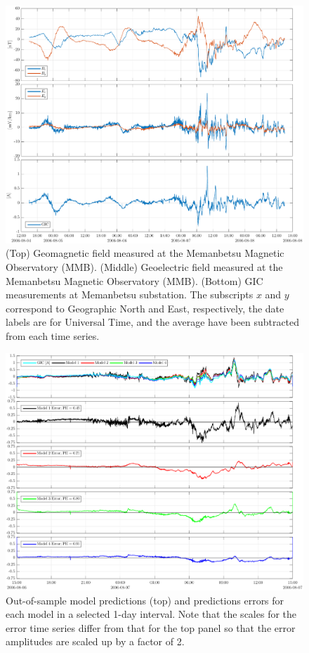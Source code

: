 \documentclass[draft,linenumbers]{agujournal2018}
\begin{document}
\begin{figure}[h]
  \centering
  \includegraphics[width=\textwidth]{figures/plot_raw_All_20060805.pdf}
  \caption{(Top) Geomagnetic field measured at the Memanbetsu Magnetic Observatory (MMB). (Middle) Geoelectric field measured at the Memanbetsu Magnetic Observatory (MMB). (Bottom) GIC measurements at Memanbetsu substation. The subscripts $x$ and $y$ correspond to Geographic North and East, respectively, the date labels are for Universal Time, and the average have been subtracted from each time series.}
  \label{sample}
\end{figure}

\begin{figure}[h]
  \centering
  \includegraphics[width=\textwidth]{figures/plot_model_predictions-MeanModel-2006-08-06.pdf}
  \caption{Out-of-sample model predictions (top) and predictions errors for each model in a selected 1-day interval. Note that the scales for the error time series differ from that for the top panel so that the error amplitudes are scaled up by a factor of 2.}
  \label{predictions}
\end{figure}
\end{document}
